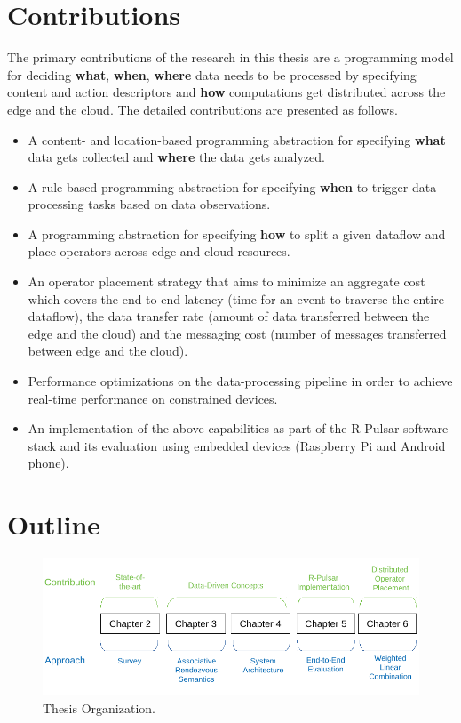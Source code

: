 \section{Contributions}
The primary contributions of the research in this thesis are a programming model for deciding \textbf{what}, \textbf{when}, \textbf{where} data needs to be processed by specifying content and action descriptors and \textbf{how} computations get distributed across the edge and the cloud. The detailed contributions are presented as follows.
\begin{itemize}
  \item A content- and location-based programming abstraction for specifying \textbf{what} data gets collected and \textbf{where} the data gets analyzed.
  \item A rule-based programming abstraction for specifying \textbf{when} to trigger data-processing tasks based on data observations.
  \item A programming abstraction for specifying \textbf{how} to split a given dataflow and place operators across edge and cloud resources.
  \item An operator placement strategy that aims to minimize an aggregate cost which covers the end-to-end latency (time for an event to traverse the entire dataflow), the data transfer rate (amount of data transferred between the edge and the cloud) and the messaging cost (number of messages transferred between edge and the cloud).
  \item Performance optimizations on the data-processing pipeline in order to achieve real-time performance on constrained devices.
  \item An implementation of the above capabilities as part of the R-Pulsar software stack and its evaluation using embedded devices (Raspberry Pi and Android phone).
\end{itemize}

\section{Outline}

\begin{figure}[h!]
  \centering
  \includegraphics[width=1\textwidth]{Figures/Outline.pdf}
  \caption{Thesis Organization.}
  \label{fig:Outline}
\end{figure}


